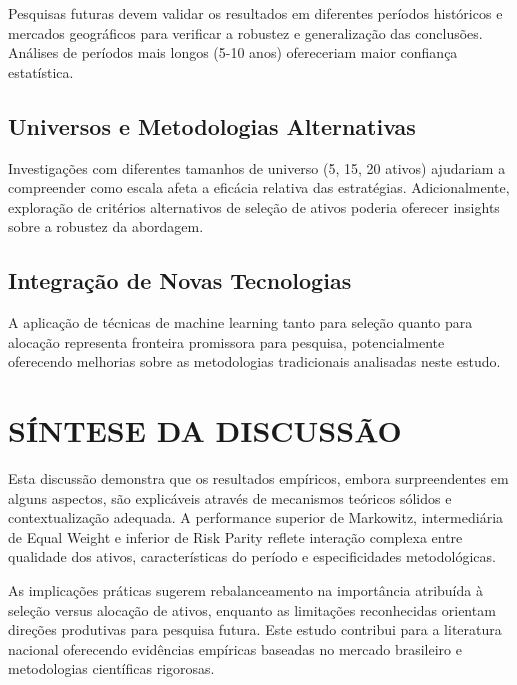 Pesquisas futuras devem validar os resultados em diferentes períodos históricos e mercados geográficos para verificar a robustez e generalização das conclusões. Análises de períodos mais longos (5-10 anos) ofereceriam maior confiança estatística.

\subsection{Universos e Metodologias Alternativas}

Investigações com diferentes tamanhos de universo (5, 15, 20 ativos) ajudariam a compreender como escala afeta a eficácia relativa das estratégias. Adicionalmente, exploração de critérios alternativos de seleção de ativos poderia oferecer insights sobre a robustez da abordagem.

\subsection{Integração de Novas Tecnologias}

A aplicação de técnicas de machine learning tanto para seleção quanto para alocação representa fronteira promissora para pesquisa, potencialmente oferecendo melhorias sobre as metodologias tradicionais analisadas neste estudo.

\section{SÍNTESE DA DISCUSSÃO}

Esta discussão demonstra que os resultados empíricos, embora surpreendentes em alguns aspectos, são explicáveis através de mecanismos teóricos sólidos e contextualização adequada. A performance superior de Markowitz, intermediária de Equal Weight e inferior de Risk Parity reflete interação complexa entre qualidade dos ativos, características do período e especificidades metodológicas.

As implicações práticas sugerem rebalanceamento na importância atribuída à seleção versus alocação de ativos, enquanto as limitações reconhecidas orientam direções produtivas para pesquisa futura. Este estudo contribui para a literatura nacional oferecendo evidências empíricas baseadas no mercado brasileiro e metodologias científicas rigorosas.